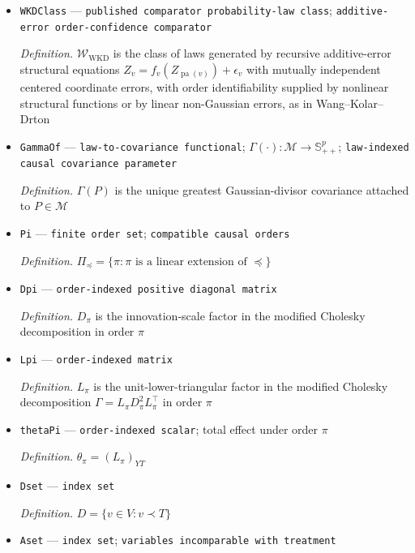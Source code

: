 \documentclass{article}
\begin{document}
\begin{itemize}
  \par\smallskip\noindent\emph{Definition.} \(\phi_X(t)=\phi_U(t)\exp(-t^\top\Gamma t/2)\)
  \item \texttt{WKDClass} --- \texttt{published comparator probability-\allowbreak{}law class}; \texttt{additive-\allowbreak{}error order-\allowbreak{}confidence comparator}
  \par\smallskip\noindent\emph{Definition.} \(\mathcal W_{\mathrm{WKD}}\) is the class of laws generated by recursive additive-error structural equations \(Z_v=f_v(Z_{\operatorname{pa}(v)})+\epsilon_v\) with mutually independent centered coordinate errors, with order identifiability supplied by nonlinear structural functions or by linear non-Gaussian errors, as in Wang--Kolar--Drton
  \item \texttt{GammaOf} --- \texttt{law-\allowbreak{}to-\allowbreak{}covariance functional}; \(\Gamma(\cdot):\mathcal M\to\mathbb S_{++}^p\); \texttt{law-\allowbreak{}indexed causal covariance parameter}
  \par\smallskip\noindent\emph{Definition.} \(\Gamma(P)\) is the unique greatest Gaussian-divisor covariance attached to \(P\in\mathcal M\)
  \item \texttt{Pi} --- \texttt{finite order set}; \texttt{compatible causal orders}
  \par\smallskip\noindent\emph{Definition.} \(\Pi_{\preceq}=\{\pi:\pi\text{ is a linear extension of }\preceq\}\)
  \item \texttt{Dpi} --- \texttt{order-\allowbreak{}indexed positive diagonal matrix}
  \par\smallskip\noindent\emph{Definition.} \(D_\pi\) is the innovation-scale factor in the modified Cholesky decomposition in order \(\pi\)
  \item \texttt{Lpi} --- \texttt{order-\allowbreak{}indexed matrix}
  \par\smallskip\noindent\emph{Definition.} \(L_\pi\) is the unit-lower-triangular factor in the modified Cholesky decomposition \(\Gamma=L_\pi D_\pi^2L_\pi^\top\) in order \(\pi\)
  \item \texttt{thetaPi} --- \texttt{order-\allowbreak{}indexed scalar}; total effect under order \(\pi\)
  \par\smallskip\noindent\emph{Definition.} \(\theta_\pi=(L_\pi)_{YT}\)
  \item \texttt{Dset} --- \texttt{index set}
  \par\smallskip\noindent\emph{Definition.} \(D=\{v\in V:v\prec T\}\)
  \item \texttt{Aset} --- \texttt{index set}; \texttt{variables incomparable with treatment}

\end{itemize}
\end{document}
